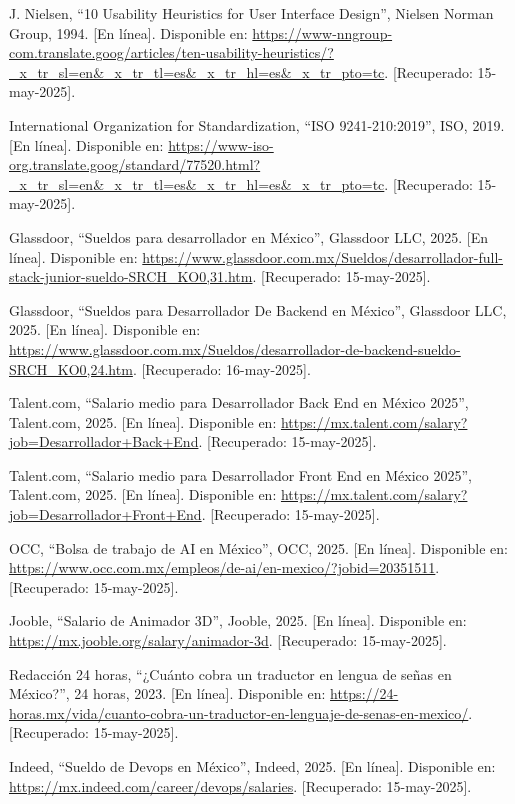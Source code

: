 \begin{thebibliography}{200}
    J. Nielsen, “10 Usability Heuristics for User Interface Design”, Nielsen Norman Group, 1994. [En línea]. Disponible en: \url{https://www-nngroup-com.translate.goog/articles/ten-usability-heuristics/?_x_tr_sl=en&_x_tr_tl=es&_x_tr_hl=es&_x_tr_pto=tc}. [Recuperado: 15-may-2025].

    International Organization for Standardization, “ISO 9241-210:2019”, ISO, 2019. [En línea]. Disponible en: \url{https://www-iso-org.translate.goog/standard/77520.html?_x_tr_sl=en&_x_tr_tl=es&_x_tr_hl=es&_x_tr_pto=tc}. [Recuperado: 15-may-2025].

    Glassdoor, “Sueldos para desarrollador en México”, Glassdoor LLC, 2025. [En línea]. Disponible en: \url{https://www.glassdoor.com.mx/Sueldos/desarrollador-full-stack-junior-sueldo-SRCH_KO0,31.htm}. [Recuperado: 15-may-2025].

    Glassdoor, “Sueldos para Desarrollador De Backend en México”, Glassdoor LLC, 2025. [En línea]. Disponible en: \url{https://www.glassdoor.com.mx/Sueldos/desarrollador-de-backend-sueldo-SRCH_KO0,24.htm}. [Recuperado: 16-may-2025].

    Talent.com, “Salario medio para Desarrollador Back End en México 2025”, Talent.com, 2025. [En línea]. Disponible en: \url{https://mx.talent.com/salary?job=Desarrollador+Back+End}. [Recuperado: 15-may-2025].

    Talent.com, “Salario medio para Desarrollador Front End en México 2025”, Talent.com, 2025. [En línea]. Disponible en: \url{https://mx.talent.com/salary?job=Desarrollador+Front+End}. [Recuperado: 15-may-2025].

    OCC, “Bolsa de trabajo de AI en México”, OCC, 2025. [En línea]. Disponible en: \url{https://www.occ.com.mx/empleos/de-ai/en-mexico/?jobid=20351511}. [Recuperado: 15-may-2025].

    Jooble, “Salario de Animador 3D”, Jooble, 2025. [En línea]. Disponible en: \url{https://mx.jooble.org/salary/animador-3d}. [Recuperado: 15-may-2025]. 

    Redacción 24 horas, “¿Cuánto cobra un traductor en lengua de señas en México?”, 24 horas, 2023. [En línea]. Disponible en: \url{https://24-horas.mx/vida/cuanto-cobra-un-traductor-en-lenguaje-de-senas-en-mexico/}. [Recuperado: 15-may-2025].

    Indeed, “Sueldo de Devops en México”, Indeed, 2025. [En línea]. Disponible en: \url{https://mx.indeed.com/career/devops/salaries}. [Recuperado: 15-may-2025].


\end{thebibliography}
